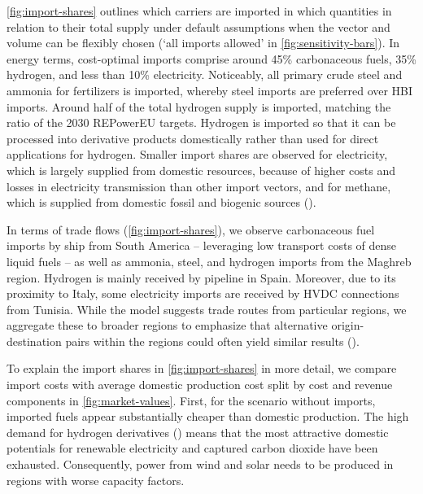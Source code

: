 
\cref{fig:import-shares} outlines which carriers are imported in which
quantities in relation to their total supply under default assumptions when the
vector and volume can be flexibly chosen (`all imports allowed' in
\cref{fig:sensitivity-bars}). In energy terms, cost-optimal imports comprise
around 45\% carbonaceous fuels, 35\% hydrogen, and less than 10\% electricity.
Noticeably, all primary crude steel and ammonia for fertilizers is imported,
whereby steel imports are preferred over HBI imports. Around half of the total
hydrogen supply is imported, matching the ratio of the 2030 REPowerEU
targets.\cite{europeancommissionRepowerEUPlan} Hydrogen is imported so that it
can be processed into derivative products domestically rather than used for
direct applications for hydrogen. Smaller import shares are observed for
electricity, which is largely supplied from domestic resources, because of
higher costs and losses in electricity transmission than other import vectors,
and for methane, which is supplied from domestic fossil and biogenic sources
().


In terms of trade flows (\cref{fig:import-shares}), we observe carbonaceous fuel
imports by ship from South America -- leveraging low transport costs of dense
liquid fuels -- as well as ammonia, steel, and hydrogen imports from the Maghreb
region. Hydrogen is mainly received by pipeline in Spain. Moreover, due to its
proximity to Italy, some electricity imports are received by HVDC connections
from Tunisia. While the model suggests trade routes from particular regions, we
aggregate these to broader regions to emphasize that alternative
origin-destination pairs within the regions could often yield similar results
().


To explain the import shares in \cref{fig:import-shares} in more detail, we
compare import costs with average domestic production cost split by cost and
revenue components in \cref{fig:market-values}. First, for the scenario without
imports, imported fuels appear substantially cheaper than domestic production.
The high demand for hydrogen derivatives () means that
the most attractive domestic potentials for renewable electricity and captured
carbon dioxide have been exhausted. Consequently, power from wind and solar
needs to be produced in regions with worse capacity factors.

